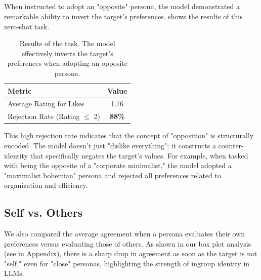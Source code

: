 \subsection{\Schismogenesis}

When instructed to adopt an "opposite" persona, the model demonstrated a remarkable ability to invert the target's preferences.  shows the results of this zero-shot task.

\begin{table}[h]
\centering
\caption{Results of the \Schismogenesis task. The model effectively inverts the target's preferences when adopting an opposite persona.}
\begin{tabular}{@{}lc@{}}
\toprule
Metric & Value \\
\midrule
Average Rating for Likes & 1.76 \\
Rejection Rate (Rating $\le$ 2) & {\bf 88\%} \\
\bottomrule
\end{tabular}
\label{tab:schismogenesis}
\end{table}

This high rejection rate indicates that the concept of "opposition" is structurally encoded. The model doesn't just "dislike everything"; it constructs a counter-identity that specifically negates the target's values. For example, when tasked with being the opposite of a "corporate minimalist," the model adopted a "maximalist bohemian" persona and rejected all preferences related to organization and efficiency.

\subsection{Self vs. Others}

We also compared the average agreement when a persona evaluates their own preferences versus evaluating those of others. As shown in our box plot analysis (see  in Appendix), there is a sharp drop in agreement as soon as the target is not "self," even for "close" personas, highlighting the strength of ingroup identity in LLMs.
